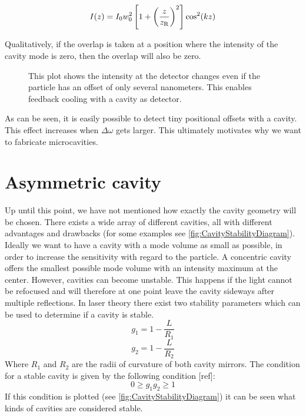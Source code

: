 \begin{equation}
	I(z)=I_0w_0^2\left[1+\left(\frac{z}{\de{z}{R}}\right)^2\right]\cos^2(kz)
\end{equation}

Qualitatively, if the overlap is taken at a position where the intensity of the cavity mode is zero, then the overlap will also be zero.

\begin{figure}[H]
	
	\caption{This plot shows the intensity at the detector changes even if the particle has an offset of only several nanometers. This enables feedback cooling with a cavity as detector.}
\end{figure}

As can be seen, it is easily possible to detect tiny positional offsets with a cavity. This effect increases when $\Delta\omega$ gets larger. This ultimately motivates why we want to fabricate microcavities.\\

\section{Asymmetric cavity}
Up until this point, we have not mentioned how exactly the cavity geometry will be chosen. There exists a wide array of different cavities, all with different advantages and drawbacks (for some examples see \autoref{fig:CavityStabilityDiagram}). Ideally we want to have a cavity with a mode volume as small as possible, in order to increase the sensitivity with regard to the particle. A concentric cavity offers the smallest possible mode volume with an intensity maximum at the center. However, cavities can become unstable. This happens if the light cannot be refocused and will therefore at one point leave the cavity sideways after multiple reflections. In laser theory there exist two stability parameters which can be used to determine if a cavity is stable.
\begin{equation}
	g_1=1-\frac{L}{R_1}
\end{equation}
\begin{equation}
	g_2=1-\frac{L}{R_2}
\end{equation}
Where $R_1$ and $R_2$ are the radii of curvature of both cavity mirrors. The condition for a stable cavity is given by the following condition [ref]:
\begin{equation}
	0\geq g_1g_2\geq 1
\end{equation}
If this condition is plotted (see \autoref{fig:CavityStabilityDiagram}) it can be seen what kinds of cavities are considered stable.

